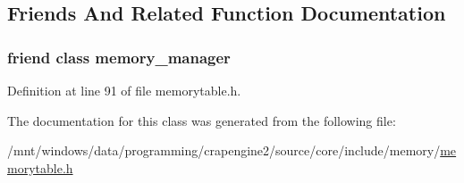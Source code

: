 \subsection{Friends And Related Function Documentation}
\hypertarget{classcrap_1_1memory__table__64_a242c93ac6853d673bc3e068a57510842}{
\subsubsection[{memory\+\_\+manager}]{\setlength{\rightskip}{0pt plus 5cm}friend class {\bf memory\+\_\+manager}\hspace{0.3cm}{\ttfamily [friend]}}}\label{classcrap_1_1memory__table__64_a242c93ac6853d673bc3e068a57510842}


Definition at line 91 of file memorytable.\+h.



The documentation for this class was generated from the following file\+:\begin{DoxyCompactItemize}
\item 
/mnt/windows/data/programming/crapengine2/source/core/include/memory/\hyperlink{memorytable_8h}{memorytable.\+h}\end{DoxyCompactItemize}
